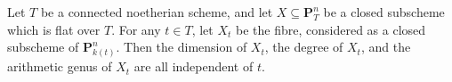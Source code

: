 Let $T$ be a connected noetherian scheme, and let $X \subseteq \mathbf{P}_T^n$ be a closed subscheme which is flat over $T$. For any $t \in T$, let $X_t$ be the fibre, considered as a closed subscheme of $\mathbf{P}_{k(t)}^n$. Then the dimension of $X_t$, the degree of $X_t$, and the arithmetic genus of $X_t$ are all independent of $t$.
